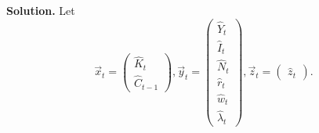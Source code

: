 \documentclass[11pt]{article}
\numberwithin{equation}{section} %
\numberwithin{figure}{section} %
\numberwithin{table}{section} %
\theoremstyle{definition}
\newenvironment{solution}{\begin{addmargin}[2em]{0em} {\bf Solution. }}{\end{addmargin}}
\begin{document}
\begin{solution}
    Let
    \[
        \vec{x}_t = \begin{pmatrix}
            \hat{K}_t \\
            \hat{C}_{t-1}
        \end{pmatrix}, \vec{y}_t = \begin{pmatrix}
            \hat{Y}_t \\
            \hat{I}_t \\
            \hat{N}_t \\
            \hat{r}_t \\
            \hat{w}_t \\
            \hat{\lambda}_t
        \end{pmatrix}, \vec{z}_t = \begin{pmatrix}
            \hat{z}_t
        \end{pmatrix}.
    \]


\end{solution}
\end{document}
